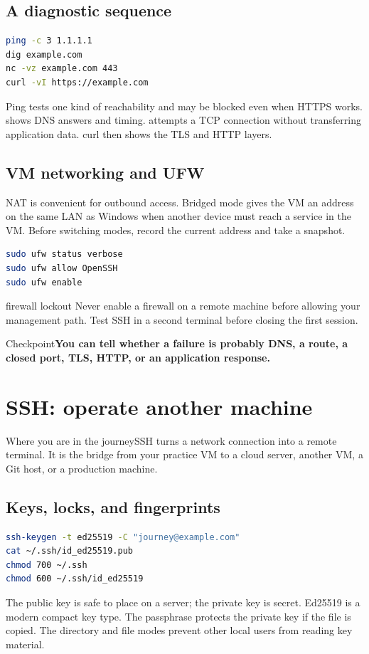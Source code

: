 \documentclass[11pt,a4paper,openany]{book}
\newcommand{\command}[1]{\texttt{\small\detokenize{#1}}}
\newcommand{\lesson}[1]{\begin{mentalbox}{Where you are in the journey}#1\end{mentalbox}}
\newcommand{\checkpoint}[1]{\begin{mentalbox}{Checkpoint}\textbf{#1}\end{mentalbox}}
\begin{document}
\section{A diagnostic sequence}
\begin{lstlisting}[language=bash]
ping -c 3 1.1.1.1
dig example.com
nc -vz example.com 443
curl -vI https://example.com
\end{lstlisting}
Ping tests one kind of reachability and may be blocked even when HTTPS works. \command{dig} shows DNS answers and timing. \command{nc -vz} attempts a TCP connection without transferring application data. curl then shows the TLS and HTTP layers.
\section{VM networking and UFW}
NAT is convenient for outbound access. Bridged mode gives the VM an address on the same LAN as Windows when another device must reach a service in the VM. Before switching modes, record the current address and take a snapshot.
\begin{lstlisting}[language=bash]
sudo ufw status verbose
sudo ufw allow OpenSSH
sudo ufw enable
\end{lstlisting}
\begin{safetybox}{firewall lockout}
Never enable a firewall on a remote machine before allowing your management path. Test SSH in a second terminal before closing the first session.
\end{safetybox}
\checkpoint{You can tell whether a failure is probably DNS, a route, a closed port, TLS, HTTP, or an application response.}

\chapter{SSH: operate another machine}
\lesson{SSH turns a network connection into a remote terminal. It is the bridge from your practice VM to a cloud server, another VM, a Git host, or a production machine.}
\section{Keys, locks, and fingerprints}
\begin{lstlisting}[language=bash]
ssh-keygen -t ed25519 -C "journey@example.com"
cat ~/.ssh/id_ed25519.pub
chmod 700 ~/.ssh
chmod 600 ~/.ssh/id_ed25519
\end{lstlisting}
The public key is safe to place on a server; the private key is secret. Ed25519 is a modern compact key type. The passphrase protects the private key if the file is copied. The directory and file modes prevent other local users from reading key material.
\end{document}
